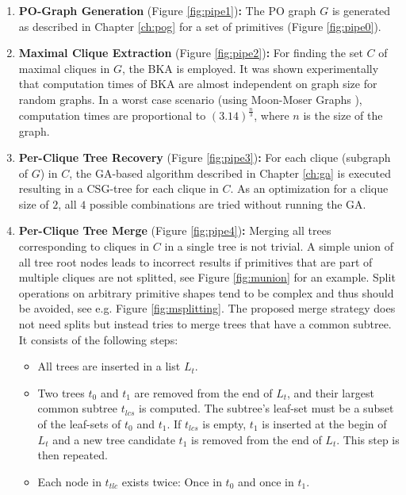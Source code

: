 \begin{enumerate}
\item \textbf{\ac{PO}-Graph Generation} (Figure \ref{fig:pipe1})\textbf: The \ac{PO} graph $G$ is generated as described in Chapter \ref{ch:pog} for a set of primitives (Figure \ref{fig:pipe0}).
\item \textbf{Maximal Clique Extraction} (Figure \ref{fig:pipe2})\textbf:
For finding the set $C$ of maximal cliques in $G$, the \ac{BKA} \cite{bron1973cliques} is employed.
It was shown experimentally \cite{bron1973cliques} that computation times of \ac{BKA} are almost independent on graph size for random graphs.
In a worst case scenario (using Moon-Moser Graphs \cite{moon1965cliques}), computation times are proportional to $(3.14)^{\frac{n}{3}}$, where $n$ is the size of the graph.
\item \textbf{Per-Clique Tree Recovery} (Figure \ref{fig:pipe3})\textbf:
For each clique (subgraph of $G$) in $C$, the \ac{GA}-based algorithm described in Chapter \ref{ch:ga} is executed resulting in a \ac{CSG}-tree for each clique in $C$.
As an optimization for a clique size of $2$, all $4$ possible combinations are tried without running the \ac{GA}. 
\item \textbf{Per-Clique Tree Merge} (Figure \ref{fig:pipe4})\textbf:
Merging all trees corresponding to cliques in $C$ in a single tree is not trivial. 
A simple union of all tree root nodes leads to incorrect results if primitives that are part of multiple cliques are not splitted, see Figure \ref{fig:munion} for an example.
Split operations on arbitrary primitive shapes tend to be complex and thus should be avoided, see e.g. Figure \ref{fig:msplitting}.  
The proposed merge strategy does not need splits but instead tries to merge trees that have a common subtree.
It consists of the following steps:
\begin{itemize}
\item All trees are inserted in a list $L_t$. 
\item Two trees $t_0$ and $t_1$ are removed from the end of $L_t$, and their largest common subtree $t_{lcs}$ is computed. The subtree's leaf-set must be a subset of the leaf-sets of $t_0$ and $t_1$. 
If $t_{lcs}$ is empty, $t_1$ is inserted at the begin of $L_t$ and a new tree candidate $t_1$ is removed from the end of $L_t$. This step is then repeated.
\item Each node in $t_{tlc}$ exists twice: Once in $t_0$ and once in $t_1$. 

\end{itemize}
\end{enumerate}
